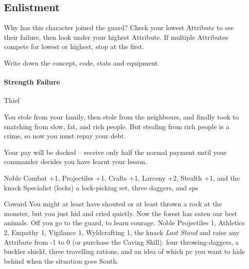 \begin{multicols}{2}

\subsection{Enlistment}
\label{enlistment}

Why has this character joined the \gls{guard}?
Check your lowest Attribute to see their failure, then look under your highest Attribute.
If multiple Attributes compete for lowest or highest, stop at the first.

Write down the concept, code, stats and equipment.

\begin{figure*}[b!]
  \label{commonWeapons}
  \commonWeaponsChart %
  \commonArmourChart
\end{figure*}

\paragraph{Strength Failure}

\begin{itemize}

    {Thief}%
    {
      You stole from your family, then stole from the neighbours, and finally took to snatching from slow, fat, and rich people.
      But stealing from rich people is a crime, so now you must repay your debt.

      Your pay will be docked -- receive only half the normal payment until your commander decides you have learnt your lesson.

    }%
    {Noble}%
    {Combat +1, Projectiles +1, Crafts +1, Larceny +2, Stealth +1, and the knack Specialist (locks)}%
    {a lock-picking set, three daggers, and  \glspl{sp}}%

    {Coward}%
    {
      You might at least have shouted or at least thrown a rock at the monster, but you just hid and cried quietly.
      Now the forest has eaten our best animals.
      Off you go to the \gls{guard}, to learn courage.
    }%
    {Noble}%
    {
      Projectiles 1, Athletics 2, Empathy 1, Vigilance 1, Wyldcrafting 1, the knack \textit{Last Stand} and raise any Attribute from -1 to 0 (or purchase the Caving Skill).
    }%
    {
      four throwing-daggers, a buckler shield, three travelling rations, and an idea of which \gls{pc} you want to hide behind when the situation goes South.
    }%



\end{itemize}
\end{multicols}
